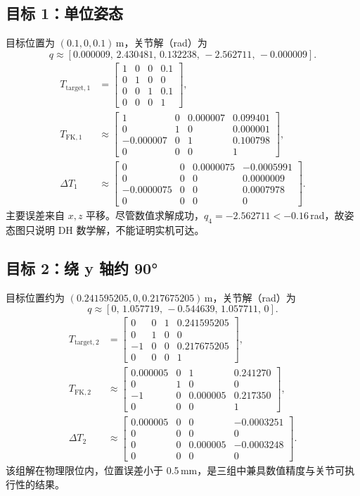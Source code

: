 \documentclass[12pt,a4paper,UTF8]{ctexart}
\begin{document}
\subsection{目标 1：单位姿态}
目标位置为 $(0.1,0,0.1)$\,m，关节解（rad）为
\[
q\approx[0.000009,\,2.430481,\,0.132238,\,-2.562711,\,-0.000009].
\]
\begin{align}
T_{\mathrm{target},1}&=
\begin{bmatrix}1&0&0&0.1\\0&1&0&0\\0&0&1&0.1\\0&0&0&1\end{bmatrix},\\
T_{\mathrm{FK},1}&\approx
\begin{bmatrix}
1&0&0.000007&0.099401\\0&1&0&0.000001\\
-0.000007&0&1&0.100798\\0&0&0&1
\end{bmatrix},\\
\Delta T_1&\approx
\begin{bmatrix}
0&0&0.0000075&-0.0005991\\0&0&0&0.0000009\\
-0.0000075&0&0&0.0007978\\0&0&0&0
\end{bmatrix}.
\end{align}
主要误差来自 $x,z$ 平移。尽管数值求解成功，$q_4=-2.562711<-0.16$\,rad，故姿态图只说明 DH 数学解，不能证明实机可达。

\subsection{目标 2：绕 y 轴约 90°}
目标位置约为 $(0.241595205,0,0.217675205)$\,m，关节解（rad）为
\[
q\approx[0,\,1.057719,\,-0.544639,\,1.057711,\,0].
\]
\begin{align}
T_{\mathrm{target},2}&=
\begin{bmatrix}
0&0&1&0.241595205\\0&1&0&0\\-1&0&0&0.217675205\\0&0&0&1
\end{bmatrix},\\
T_{\mathrm{FK},2}&\approx
\begin{bmatrix}
0.000005&0&1&0.241270\\0&1&0&0\\-1&0&0.000005&0.217350\\0&0&0&1
\end{bmatrix},\\
\Delta T_2&\approx
\begin{bmatrix}
0.000005&0&0&-0.0003251\\0&0&0&0\\0&0&0.000005&-0.0003248\\0&0&0&0
\end{bmatrix}.
\end{align}
该组解在物理限位内，位置误差小于 0.5\,mm，是三组中兼具数值精度与关节可执行性的结果。
\end{document}
